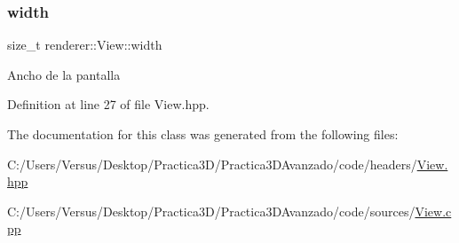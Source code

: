 \subsubsection{\texorpdfstring{width}{width}}
{\footnotesize\ttfamily size\+\_\+t renderer\+::\+View\+::width\hspace{0.3cm}{\ttfamily [private]}}

Ancho de la pantalla 

Definition at line 27 of file View.\+hpp.



The documentation for this class was generated from the following files\+:\begin{DoxyCompactItemize}
\item 
C\+:/\+Users/\+Versus/\+Desktop/\+Practica3\+D/\+Practica3\+D\+Avanzado/code/headers/\mbox{\hyperlink{_view_8hpp}{View.\+hpp}}\item 
C\+:/\+Users/\+Versus/\+Desktop/\+Practica3\+D/\+Practica3\+D\+Avanzado/code/sources/\mbox{\hyperlink{_view_8cpp}{View.\+cpp}}\end{DoxyCompactItemize}
